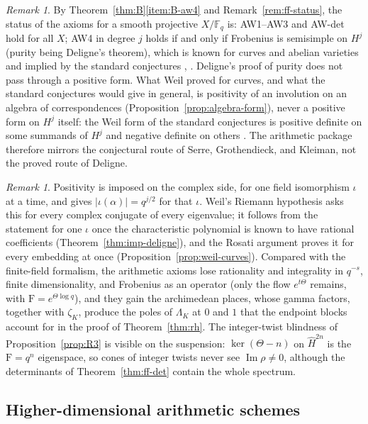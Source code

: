 \documentclass[11pt]{amsart}
\theoremstyle{plain}
\theoremstyle{definition}
\theoremstyle{remark}
\newtheorem{remark}[theorem]{Remark}
\numberwithin{equation}{section}
\newcommand{\F}{\mathbb{F}}
\DeclareMathOperator{\Ima}{Im}
\renewcommand{\Im}{\Ima}
\begin{document}
\begin{remark}\label{rem:B-status}
By Theorem~\ref{thm:B}\ref{item:B-aw4} and Remark~\ref{rem:ff-status},
the status of the axioms for a smooth projective $X/\F_q$ is: AW1--AW3
and AW-det hold for all $X$; AW4 in degree $j$ holds if and only if
Frobenius is semisimple on $H^j$ (purity being Deligne's theorem), which
is known for curves and abelian varieties and implied by the standard
conjectures \cite[p.~10]{Kleiman1994Standard},
\cite[Aside~3.18, p.~42]{Milne2016RHFF}. Deligne's proof of purity does not
pass through a positive form. What Weil proved for curves, and what the
standard conjectures would give in general, is positivity of an
involution on an algebra of correspondences
(Proposition~\ref{prop:algebra-form}), never a positive form on $H^j$
itself: the Weil form of the standard conjectures is positive definite
on some summands of $H^j$ and negative definite on others
\cite[Definition~3.6, p.~39, Theorem~3.15, and fn.~36, p.~42]%
{Milne2016RHFF}. The arithmetic package
therefore mirrors the conjectural route of Serre, Grothendieck, and
Kleiman, not the proved route of Deligne.
\end{remark}

\begin{remark}\label{rem:B-iota}
Positivity is imposed on the complex side, for one field isomorphism
$\iota$ at a time, and gives $|\iota(\alpha)|=q^{j/2}$ for that $\iota$.
Weil's Riemann hypothesis asks this for every complex conjugate of every
eigenvalue; it follows from the statement for one $\iota$ once the
characteristic polynomial is known to have rational coefficients
(Theorem~\ref{thm:imp-deligne}), and the Rosati argument proves it for
every embedding at once (Proposition~\ref{prop:weil-curves}). Compared
with the finite-field formalism, the arithmetic axioms lose rationality
and integrality in $q^{-s}$, finite dimensionality, and Frobenius as an
operator (only the flow $e^{t\Theta}$ remains, with
$\mathrm{F}=e^{\Theta\log q}$), and they gain the archimedean places,
whose gamma factors, together with $\zeta_K$, produce the poles of
$\Lambda_K$ at $0$ and $1$ that the endpoint blocks account for in the
proof of Theorem~\ref{thm:rh}. The integer-twist blindness of
Proposition~\ref{prop:R3} is visible on the suspension: $\ker(\Theta-n)$
on $\widehat H^{2n}$ is the $\mathrm{F}=q^n$ eigenspace, so cones of
integer twists never see $\Im\rho\ne0$, although the determinants of
Theorem~\ref{thm:ff-det} contain the whole spectrum.
\end{remark}
\subsection{Higher-dimensional arithmetic schemes}\label{subsec:schemes}
\end{document}
